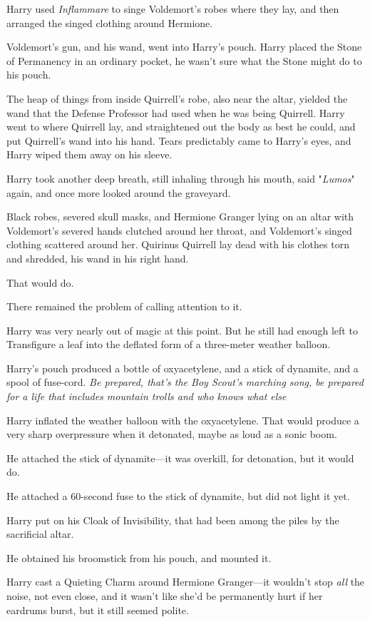 Harry used \emph{Inflammare} to singe Voldemort's robes where they lay, and
then arranged the singed clothing around Hermione.

Voldemort's gun, and his wand, went into Harry's pouch. Harry placed the Stone
of Permanency in an ordinary pocket, he wasn't sure what the Stone might do to
his pouch.

The heap of things from inside Quirrell's robe, also near the altar, yielded
the wand that the Defense Professor had used when he was being Quirrell. Harry
went to where Quirrell lay, and straightened out the body as best he could, and
put Quirrell's wand into his hand. Tears predictably came to Harry's eyes, and
Harry wiped them away on his sleeve.

Harry took another deep breath, still inhaling through his mouth, said
"\emph{Lumos}" again, and once more looked around the graveyard.

Black robes, severed skull masks, and Hermione Granger lying on an altar with
Voldemort's severed hands clutched around her throat, and Voldemort's singed
clothing scattered around her. Quirinus Quirrell lay dead with his clothes torn
and shredded, his wand in his right hand.

That would do.

There remained the problem of calling attention to it.

Harry was very nearly out of magic at this point. But he still had enough left
to Transfigure a leaf into the deflated form of a three-meter weather balloon.

Harry's pouch produced a bottle of oxyacetylene, and a stick of dynamite, and a
spool of fuse-cord. \emph{Be prepared, that's the Boy Scout's marching song, be
prepared for a life that includes mountain trolls and who knows what
else{\el}}

Harry inflated the weather balloon with the oxyacetylene. That would produce a
very sharp overpressure when it detonated, maybe as loud as a sonic boom.

He attached the stick of dynamite—it was overkill, for detonation, but it
would do.

He attached a 60-second fuse to the stick of dynamite, but did not light it yet.

Harry put on his Cloak of Invisibility, that had been among the piles by the
sacrificial altar.

He obtained his broomstick from his pouch, and mounted it.

Harry cast a Quieting Charm around Hermione Granger—it wouldn't stop
\emph{all} the noise, not even close, and it wasn't like she'd be permanently
hurt if her eardrums burst, but it still seemed polite.


